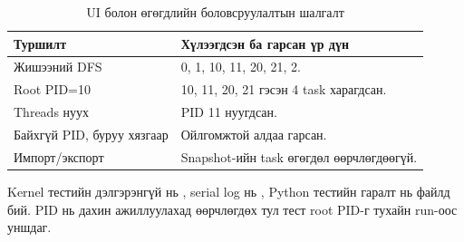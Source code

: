 \begin{table}[H]
\centering\small
\caption{UI болон өгөгдлийн боловсруулалтын шалгалт}
\begin{tabularx}{\textwidth}{|P{4.3cm}|Y|}\hline
{}\textbf{Туршилт} & \textbf{Хүлээгдсэн ба гарсан үр дүн} \\\hline
Жишээний DFS & 0, 1, 10, 11, 20, 21, 2. \\\hline
Root PID=10 & 10, 11, 20, 21 гэсэн 4 task харагдсан. \\\hline
Threads нуух & PID 11 нуугдсан. \\\hline
Байхгүй PID, буруу хязгаар & Ойлгомжтой алдаа гарсан. \\\hline
Импорт/экспорт & Snapshot-ийн task өгөгдөл өөрчлөгдөөгүй. \\\hline
\end{tabularx}
\end{table}
Kernel тестийн дэлгэрэнгүй нь , serial log нь , Python тестийн гаралт нь  файлд бий. PID нь дахин ажиллуулахад өөрчлөгдөх тул тест root PID-г тухайн run-оос уншдаг.

